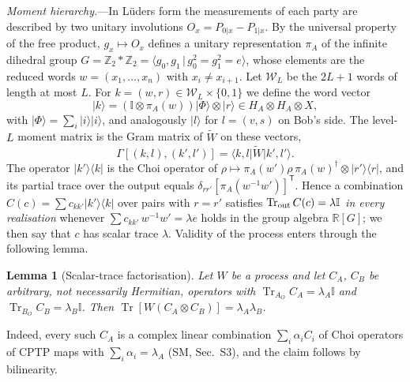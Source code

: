 \documentclass[aps,prl,twocolumn,superscriptaddress,longbibliography,nofootinbib]{revtex4-2}
\newtheorem{lemma}{Lemma}
\newcommand{\Tr}{\operatorname{Tr}}
\newcommand{\ket}[1]{\lvert #1\rangle}
\newcommand{\bra}[1]{\langle #1\rvert}
\newcommand{\one}{\mathbb{I}}
\newcommand{\tp}{\mathsf{T}}
\newcommand{\RR}{\mathbb{R}}
\newcommand{\ZZ}{\mathbb{Z}}
\newcommand{\cW}{\mathcal{W}}
\begin{document}
\emph{Moment hierarchy.}---In L\"uders form the measurements of each party are described by two unitary involutions $O_x=P_{0|x}-P_{1|x}$. By the universal property of the free product, $g_x\mapsto O_x$ defines a unitary representation $\pi_A$ of the infinite dihedral group $G=\ZZ_2*\ZZ_2=\langle g_0,g_1\,|\,g_0^2=g_1^2=e\rangle$, whose elements are the reduced words $w=(x_1,\dots,x_n)$ with $x_i\neq x_{i+1}$. Let $\cW_L$ be the $2L+1$ words of length at most $L$. For $k=(w,r)\in\cW_L\times\{0,1\}$ we define the word vector
\begin{equation}
\ket{k}=(\one\otimes\pi_A(w))\ket{\Phi}\otimes\ket{r}\in H_A\otimes H_A\otimes X ,
\end{equation}
with $\ket{\Phi}=\sum_i\ket{i}\ket{i}$, and analogously $\ket{l}$ for $l=(v,s)$ on Bob's side. The level-$L$ moment matrix is the Gram matrix of $\widetilde W$ on these vectors,
\begin{equation}
\Gamma[(k,l),(k',l')]=\bra{k,l}\widetilde W\ket{k',l'} .
\label{eq:gamma}
\end{equation}
The operator $\ket{k'}\bra{k}$ is the Choi operator of $\rho\mapsto\pi_A(w')\rho\,\pi_A(w)^\dagger\otimes\ket{r'}\bra{r}$, and its partial trace over the output equals $\delta_{rr'}[\pi_A(w^{-1}w')]^\tp$. Hence a combination $C(c)=\sum c_{kk'}\ket{k'}\bra{k}$ over pairs with $r=r'$ satisfies $\Tr_{\rm out}C(c)=\lambda\one$ \emph{in every realisation} whenever $\sum c_{kk'}\,w^{-1}w'=\lambda e$ holds in the group algebra $\RR[G]$; we then say that $c$ has scalar trace $\lambda$. Validity of the process enters through the following lemma.

\begin{lemma}[Scalar-trace factorisation]\label{lem:v2}
Let $W$ be a process and let $C_A$, $C_B$ be arbitrary, not necessarily Hermitian, operators with $\Tr_{A_O}C_A=\lambda_A\one$ and $\Tr_{B_O}C_B=\lambda_B\one$. Then $\Tr[W(C_A\otimes C_B)]=\lambda_A\lambda_B$.
\end{lemma}

Indeed, every such $C_A$ is a complex linear combination $\sum_i\alpha_iC_i$ of Choi operators of CPTP maps with $\sum_i\alpha_i=\lambda_A$ (SM, Sec.~S3), and the claim follows by bilinearity.
\end{document}

